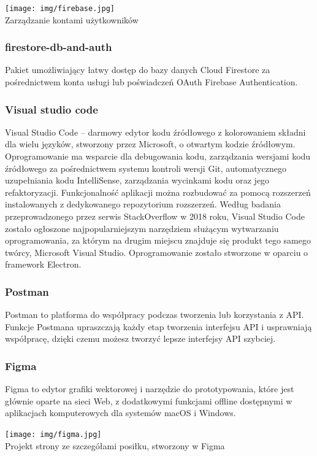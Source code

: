 \documentclass[12pt,a4paper]{article}
\begin{document}
		\begin{center}
			\texttt{[image: img/firebase.jpg]}\\
			Zarządzanie kontami użytkowników
		\end{center}	
					
										
					
		\subsubsection{firestore-db-and-auth}

					\indent Pakiet umożliwiający łatwy dostęp do bazy danych Cloud Firestore za pośrednictwem konta usługi lub poświadczeń OAuth Firebase Authentication.
					\subsubsection{Visual studio code}

					\indent Visual Studio Code – darmowy edytor kodu źródłowego z kolorowaniem składni dla wielu języków, stworzony przez Microsoft,
					o otwartym kodzie źródłowym. Oprogramowanie ma wsparcie dla debugowania kodu, zarządzania wersjami kodu źródłowego za pośrednictwem systemu kontroli wersji Git,
					automatycznego uzupełniania kodu IntelliSense, zarządzania wycinkami kodu oraz jego refaktoryzacji. Funkcjonalność aplikacji można rozbudować za pomocą rozszerzeń
					instalowanych z dedykowanego repozytorium rozszerzeń. Według badania przeprowadzonego przez serwis StackOverflow w 2018 roku, Visual Studio Code zostało
					ogłoszone najpopularniejszym narzędziem służącym wytwarzaniu oprogramowania, za którym na drugim miejscu znajduje się produkt tego samego twórcy,
					Microsoft Visual Studio. Oprogramowanie zostało stworzone w oparciu o framework Electron. 
					\subsubsection{Postman}
		Postman to platforma do współpracy podczas tworzenia lub korzystania z API. Funkcje Postmana upraszczają każdy etap tworzenia interfejsu API i usprawniają współpracę, dzięki czemu możesz tworzyć lepsze interfejsy API szybciej.
					\subsubsection{Figma}		
				\indent	Figma to edytor grafiki wektorowej i narzędzie do prototypowania, które jest głównie oparte na sieci Web, z dodatkowymi funkcjami offline dostępnymi w aplikacjach komputerowych dla systemów macOS i Windows.
		\begin{center}
		\texttt{[image: img/figma.jpg]}\\
		Projekt strony ze szczegółami posiłku, stworzony w Figma
	\end{center}		
	\newpage
	
\end{document}
